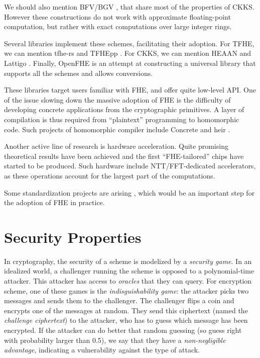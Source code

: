 We should also mention BFV/BGV \cite{C:Brakersky12, bgv, EPRINT:FanVer12}, that share most of the properties of CKKS. However these constructions do not work with approximate floating-point computation, but rather with exact computations over large integer rings.


Several libraries implement these schemes, facilitating their adoption. For TFHE, we can mention tfhe-rs \cite{tfhe-rs}  and TFHEpp \cite{TFHEpp}. For CKKS, we can mention HEAAN \cite{heean} and Lattigo \cite{lattigo}. Finally, OpenFHE \cite{openfhe} is an attempt at constructing a universal library that supports all the schemes and allows conversions.


These libraries target users familiar with FHE, and offer quite low-level API. One of the issue slowing down the massive adoption of FHE is the difficulty of developing concrete applications from the cryptographic primitives. A layer of compilation is thus required from ``plaintext'' programming to homomorphic code. Such projects of homomorphic compiler include Concrete \cite{Concrete} and heir \cite{HEIR}.


Another active line of research is hardware acceleration. Quite promising theoretical results have been achieved \cite{TCHES:GVPHMS23, EPRINT:BBTV23a, EPRINT:CPBFSJ23, EPRINT:KHMR24} and the first ``FHE-tailored'' chips have started to be produced. Such hardware include NTT/FFT-dedicated accelerators, as these operations account for the largest part of the computations. 


Some standardization projects are arising \cite{HomomorphicEncryptionSecurityStandard, call_nist}, which would be an important step for the adoption of FHE in practice.
 	


\section{Security Properties}


In cryptography, the security of a scheme is modelized by a \textit{security game}. In an idealized world, a challenger running the scheme is opposed to a polynomial-time attacker. This attacker has access to \textit{oracles} that they can query. For encryption scheme, one of these games is the \textit{indisguishability game}: the attacker picks two messages and sends them to the challenger. The challenger flips a coin and encrypts one of the messages at random. They send this ciphertext (named the \textit{challenge ciphertext}) to the attacker, who has to guess which message has been encrypted. If the attacker can do better that random guessing (so guess right with probability larger than 0.5), we say that they have a \textit{non-negligible advantage}, indicating a vulnerability against the type of attack.

